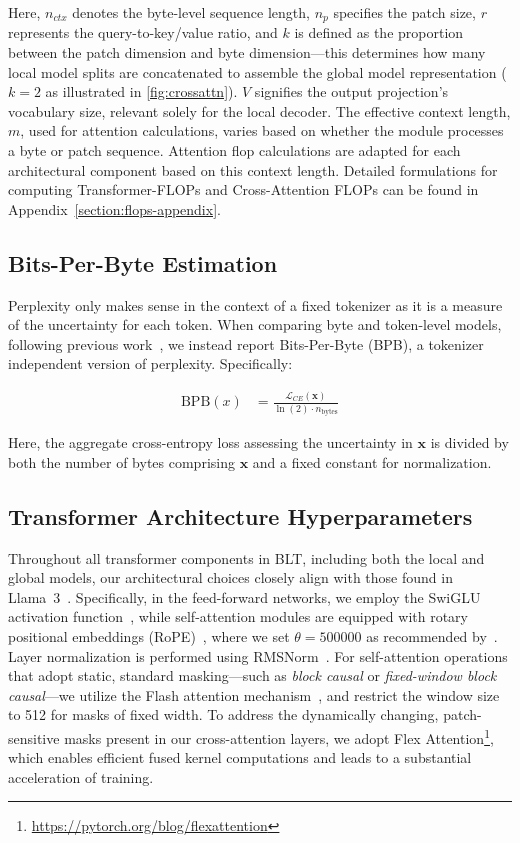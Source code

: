 Here, $n_{ctx}$ denotes the byte-level sequence length, $n_p$ specifies the patch size, $r$ represents the query-to-key/value ratio, and $k$ is defined as the proportion between the patch dimension and byte dimension—this determines how many local model splits are concatenated to assemble the global model representation ($k=2$ as illustrated in \autoref{fig:crossattn}). $V$ signifies the output projection’s vocabulary size, relevant solely for the local decoder. The effective context length, $m$, used for attention calculations, varies based on whether the module processes a byte or patch sequence. Attention flop calculations are adapted for each architectural component based on this context length. Detailed formulations for computing Transformer-FLOPs and Cross-Attention FLOPs can be found in Appendix~\ref{section:flops-appendix}.

\subsection{Bits-Per-Byte Estimation} Perplexity only makes sense in the context of a fixed tokenizer as it is a measure of the uncertainty for each token. When comparing byte and token-level models, following previous work~\citep{xue2022byt5, yu2023megabyte, wang2024mambabyte}, we instead report Bits-Per-Byte (BPB), a tokenizer independent version of perplexity. Specifically:

\begin{align}
    \text{BPB}(x)&= \frac{\mathcal{L}_{CE}(\pmb{x})}{\ln(2)\cdot n_{\text{bytes}}}
\end{align}

Here, the aggregate cross-entropy loss assessing the uncertainty in $\pmb{x}$ is divided by both the number of bytes comprising $\pmb{x}$ and a fixed constant for normalization.

\subsection{Transformer Architecture Hyperparameters} Throughout all transformer components in {\textsc BLT}, including both the local and global models, our architectural choices closely align with those found in Llama~3~\citep{dubey2024llama}. Specifically, in the feed-forward networks, we employ the SwiGLU activation function~\citep{swiglu}, while self-attention modules are equipped with rotary positional embeddings (RoPE)~\citep{RoPe}, where we set $\theta=500000$ as recommended by~\citep{xiong2024effective}. Layer normalization is performed using RMSNorm~\citep{RMSNorm}. For self-attention operations that adopt static, standard masking—such as \textit{block causal} or \textit{fixed-window block causal}—we utilize the Flash attention mechanism~\citep{dao2022flashattention}, and restrict the window size to 512 for masks of fixed width. To address the dynamically changing, patch-sensitive masks present in our cross-attention layers, we adopt Flex Attention\footnote{\url{https://pytorch.org/blog/flexattention}}, which enables efficient fused kernel computations and leads to a substantial acceleration of training.

